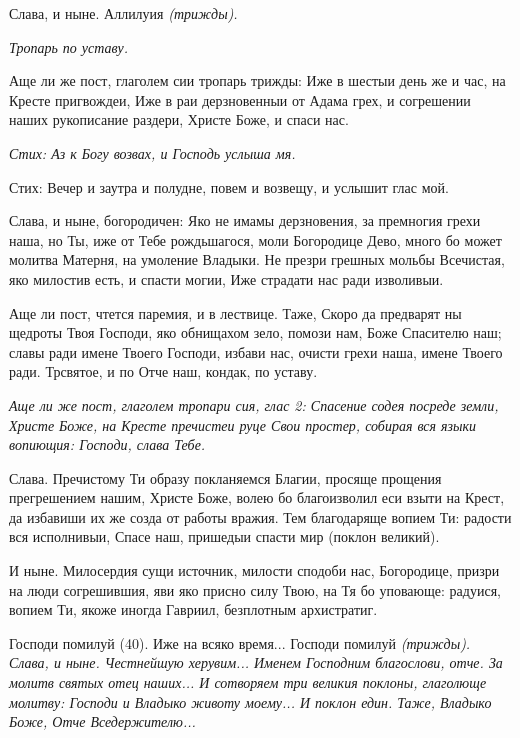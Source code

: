 Слава, и ныне. Аллилуия \itshape (трижды)\normalfont{}.


\itshape Тропарь по уставу.\normalfont{}


Аще ли же пост, глаголем сии тропарь трижды: Иже в шестыи день же и час, на Кресте пригвождеи, Иже в раи дерзновенныи от Адама грех, и согрешении наших рукописание раздери, Христе Боже, и спаси нас.


\itshape Стих:\normalfont{} Аз к Богу возвах, и Господь услыша мя.


Стих: Вечер и заутра и полудне, повем и возвещу, и услышит глас мой.


Слава, и ныне, богородичен: Яко не имамы дерзновения, за премногия грехи наша, но Ты, иже от Тебе рождьшагося, моли Богородице Дево, много бо может молитва Матерня, на умоление Владыки. Не презри грешных мольбы Всечистая, яко милостив есть, и спасти могии, Иже страдати нас ради изволивыи.


Аще ли пост, чтется паремия, и в лествице. Таже, Скоро да предварят ны щедроты Твоя Господи, яко обнищахом зело, помози нам, Боже Спасителю наш; славы ради имене Твоего Господи, избави нас, очисти грехи наша, имене Твоего ради. Трсвятое, и по Отче наш, кондак, по уставу.


\itshape Аще ли же пост, глаголем тропари сия, глас 2:\normalfont{} Спасение содея посреде земли, Христе Боже, на Кресте пречистеи руце Свои простер, собирая вся языки вопиющия: Господи, слава Тебе.


Слава. Пречистому Ти образу покланяемся Благии, просяще прощения прегрешением нашим, Христе Боже, волею бо благоизволил еси взыти на Крест, да избавиши их же созда от работы вражия. Тем благодаряще вопием Ти: радости вся исполнивыи, Спасе наш, пришедыи спасти мир (поклон великий).


И ныне. Милосердия сущи источник, милости сподоби нас, Богородице, призри на люди согрешившия, яви яко присно силу Твою, на Тя бо уповающе: радуися, вопием Ти, якоже иногда Гавриил, безплотным архистратиг.


Господи помилуй (40). Иже на всяко время... Господи помилуй \itshape (трижды)\normalfont{}. Слава, и ныне. Честнейшую херувим... Именем Господним благослови, отче. За молитв святых отец наших... И сотворяем три великия поклоны, глаголюще молитву: Господи и Владыко животу моему... И поклон един. Таже, Владыко Боже, Отче Вседержителю...


